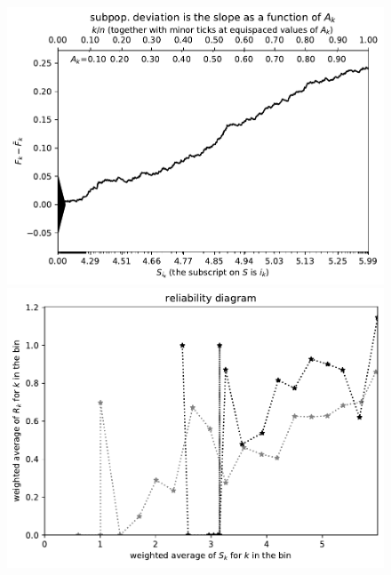 \documentclass{article}
\begin{document}
\begin{figure}
\begin{centering}

\parbox{\imsize}{\includegraphics[width=\imsize]
{./codes/weighted/County_of_San_Joaquin-NRC/cumulative}}
\quad\quad
\parbox{\imsize}{\includegraphics[width=\imsize]
{./codes/weighted/County_of_San_Joaquin-NRC/equiscores20}}

\vspace{\vertsep}


\end{centering}
\end{figure}
\end{document}
